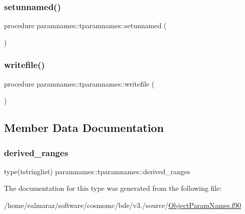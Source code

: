 \mbox{\label{structparamnames_1_1tparamnames_afacedad68652a1f8dfc3c2752441eaf7}} 
\subsubsection{\texorpdfstring{setunnamed()}{setunnamed()}}
{\footnotesize\ttfamily procedure paramnames\+::tparamnames\+::setunnamed (\begin{DoxyParamCaption}{ }\end{DoxyParamCaption})\hspace{0.3cm}{\ttfamily [private]}}

\mbox{\label{structparamnames_1_1tparamnames_a11fc60c01d47eedde725732435d1ff6d}} 
\subsubsection{\texorpdfstring{writefile()}{writefile()}}
{\footnotesize\ttfamily procedure paramnames\+::tparamnames\+::writefile (\begin{DoxyParamCaption}{ }\end{DoxyParamCaption})\hspace{0.3cm}{\ttfamily [private]}}



\subsection{Member Data Documentation}
\mbox{\label{structparamnames_1_1tparamnames_a6b93a9513527c2ea0e8c99603e31c92d}} 
\subsubsection{\texorpdfstring{derived\+\_\+ranges}{derived\_ranges}}
{\footnotesize\ttfamily type(tstringlist) paramnames\+::tparamnames\+::derived\+\_\+ranges\hspace{0.3cm}{\ttfamily [private]}}



The documentation for this type was generated from the following file\+:\begin{DoxyCompactItemize}
\item 
/home/ealmaraz/software/cosmomc/bde/v3./source/\mbox{\hyperlink{ObjectParamNames_8f90}{Object\+Param\+Names.\+f90}}\end{DoxyCompactItemize}
